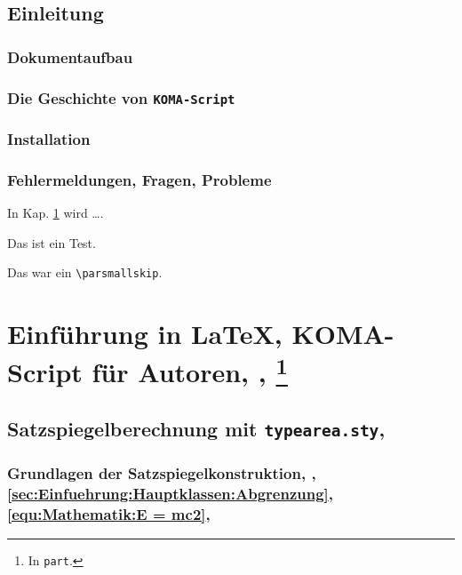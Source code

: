 \chapter{Einleitung}
\label{chap:Einleitung}
\section{Dokumentaufbau}
\label{sec:Einleitung:Dokumentaufbau}
\lipsum[1-2]
\section{Die Geschichte von \texttt{KOMA-Script}}
\label{sec:Einleitung:Geschichte}
\lipsum[1-2]
\section{Installation}
\label{sec:Einleitung:Installation}
\lipsum[1-2]
\section{Fehlermeldungen, Fragen, Probleme}
\label{sec:Einleitung:Fehlermeldung, Frage, Probleme}
In Kap. \ref{chap:Einleitung} wird \ldots{}.\par%
Das ist ein Test.\par\smallskip
Das war ein \verb|\parsmallskip|.
\lipsum[1-2]
\lipsum[1-3]
\lipsum[1-4]


\part[Einführung in \LaTeX{}, KOMA-Script für Autoren\texorpdfstring{, \cite{LabenbacherTeX}}{}]{Einführung in \LaTeX{}, KOMA-Script für Autoren\texorpdfstring{, \cite{LabenbacherTeX}, \protect\footnote{In \texttt{part}.}}{}}%
\label{part:Einfuehrung in LaTeX, KOMA-Script fuer Autoren, scrbook}%
\chapter[Satzspiegelberechnung mit \texttt{typearea.sty}]{Satzspiegelberechnung mit \texttt{typearea.sty}\texorpdfstring{, \protect\footnotemark{}}{}}%
\label{chap:Einfuehrung:Satzspiegelberechnung}%
\section[Grundlagen der Satzspiegelkonstruktion]{Grundlagen der Satzspiegelkonstruktion\texorpdfstring{, \cite{LabenbacherTeX}, \ref{sec:Einfuehrung:Hauptklassen:Abgrenzung}, \eqref{equ:Mathematik:E = mc2}}{}\texorpdfstring{, \protect\mbox{\footnotemark}}{}}%
\label{sec:Einfuehrung:Satzspiegelberechnung:Grundlagen}%
